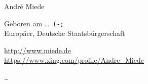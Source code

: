 \documentclass[10pt,a4paper]{scrartcl}
\begin{document}
    \begin{cv}{}
        \begin{cvlist}{}\label{PersDat}  
            \item   Andr\'e Miede
            \item   Geboren am \dots\ \texttt{(-;} \\	
                    Europ\"aer, Deutsche Staatsb\"urgerschaft 
            \item   \url{http://www.miede.de} \\				
                    \url{https://www.xing.com/profile/Andre_Miede}				
        \end{cvlist}
        
        \begin{cvlist}{}\label{irgendwas}
            \item   \dots 
        \end{cvlist}
    \end{cv}
\end{document}
